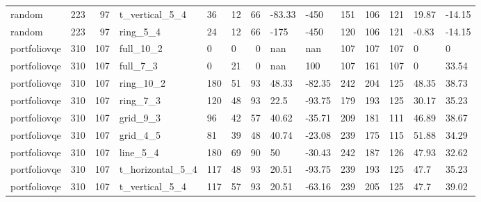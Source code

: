 \begin{longtable}{lrrlllrllllrll}
random & 223 & 97 & t\_vertical\_5\_4 & 36 & 12 & 66 & -83.33 & -450 & 151 & 106 & 121 & 19.87 & -14.15 \\
random & 223 & 97 & ring\_5\_4 & 24 & 12 & 66 & -175 & -450 & 120 & 106 & 121 & -0.83 & -14.15 \\
portfoliovqe & 310 & 107 & full\_10\_2 & 0 & 0 & 0 & nan & nan & 107 & 107 & 107 & 0 & 0 \\
portfoliovqe & 310 & 107 & full\_7\_3 & 0 & 21 & 0 & nan & 100 & 107 & 161 & 107 & 0 & 33.54 \\
portfoliovqe & 310 & 107 & ring\_10\_2 & 180 & 51 & 93 & 48.33 & -82.35 & 242 & 204 & 125 & 48.35 & 38.73 \\
portfoliovqe & 310 & 107 & ring\_7\_3 & 120 & 48 & 93 & 22.5 & -93.75 & 179 & 193 & 125 & 30.17 & 35.23 \\
portfoliovqe & 310 & 107 & grid\_9\_3 & 96 & 42 & 57 & 40.62 & -35.71 & 209 & 181 & 111 & 46.89 & 38.67 \\
portfoliovqe & 310 & 107 & grid\_4\_5 & 81 & 39 & 48 & 40.74 & -23.08 & 239 & 175 & 115 & 51.88 & 34.29 \\
portfoliovqe & 310 & 107 & line\_5\_4 & 180 & 69 & 90 & 50 & -30.43 & 242 & 187 & 126 & 47.93 & 32.62 \\
portfoliovqe & 310 & 107 & t\_horizontal\_5\_4 & 117 & 48 & 93 & 20.51 & -93.75 & 239 & 193 & 125 & 47.7 & 35.23 \\
portfoliovqe & 310 & 107 & t\_vertical\_5\_4 & 117 & 57 & 93 & 20.51 & -63.16 & 239 & 205 & 125 & 47.7 & 39.02 \\
\end{longtable}
